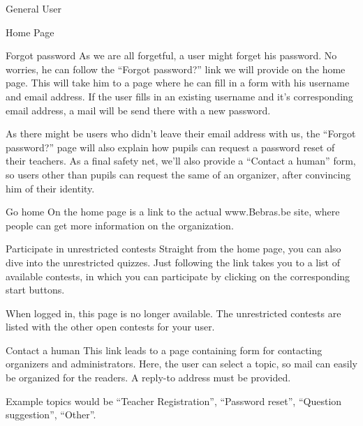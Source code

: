 \begin{section}{General User}
\begin{subsection}{Home Page}
        \begin{subsubsection}{Forgot password}
            As we are all forgetful, a user might forget his password. No
            worries, he can follow the ``Forgot password?'' link we will provide
            on the home page. This will take him to a page where he can fill in
            a form with his username and email address. If the user fills in an
            existing username and it's corresponding email address, a mail will
            be send there with a new password.

            As there might be users who didn't leave their email address with
            us, the ``Forgot password?'' page will also explain how pupils can
            request a password reset of their teachers. As a final safety net,
            we'll also provide a ``Contact a human'' form, so users other than
            pupils can request the same of an organizer, after convincing him of
            their identity.
        \end{subsubsection}

        \begin{subsubsection}{Go home}
            On the home page is a link to the actual www.Bebras.be site, where
            people can get more information on the organization.
        \end{subsubsection}

        \begin{subsubsection}{Participate in unrestricted contests}
            Straight from the home page, you can also dive into the unrestricted
            quizzes. Just following the link takes you to a list of available
            contests, in which you can participate by clicking on the
            corresponding start buttons.

            When logged in, this page is no longer available. The unrestricted
            contests are listed with the other open contests for your user.
        \end{subsubsection}

        \begin{subsubsection}{Contact a human}
            This link leads to a page containing form for contacting organizers
            and administrators. Here, the user can select a topic, so mail can
            easily be organized for the readers. A reply-to address must be
            provided.

            Example topics would be ``Teacher Registration'', ``Password
            reset'', ``Question suggestion'', ``Other''.
        \end{subsubsection}


\end{subsection}
\end{section}
